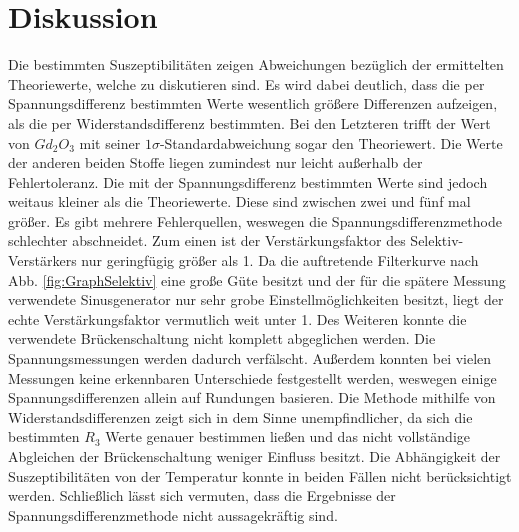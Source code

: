 
\section{Diskussion}
\label{sec:Diskussion}


Die bestimmten Suszeptibilitäten zeigen Abweichungen bezüglich der ermittelten Theoriewerte, welche zu diskutieren sind. Es wird dabei deutlich, dass die per Spannungsdifferenz 
bestimmten Werte wesentlich größere Differenzen aufzeigen, als die per Widerstandsdifferenz bestimmten. Bei den Letzteren trifft der Wert von $Gd_2O_3$ mit seiner $1 \sigma$-Standardabweichung sogar den Theoriewert. Die Werte der anderen beiden Stoffe liegen zumindest nur leicht außerhalb der Fehlertoleranz. Die mit der Spannungsdifferenz bestimmten Werte sind jedoch weitaus kleiner als die Theoriewerte. Diese sind zwischen zwei und fünf mal größer.
 Es gibt mehrere Fehlerquellen, weswegen die Spannungsdifferenzmethode schlechter abschneidet. Zum einen ist der Verstärkungsfaktor
des Selektiv-Verstärkers nur geringfügig größer als 1. Da die auftretende Filterkurve nach
Abb. \ref{fig:GraphSelektiv} eine große Güte besitzt und der für die spätere
Messung verwendete Sinusgenerator nur sehr grobe Einstellmöglichkeiten besitzt,
liegt der echte Verstärkungsfaktor vermutlich weit unter 1. Des Weiteren konnte
die verwendete Brückenschaltung nicht komplett abgeglichen werden. Die Spannungsmessungen werden dadurch verfälscht. Außerdem
konnten bei vielen Messungen keine erkennbaren Unterschiede festgestellt werden, weswegen einige Spannungsdifferenzen allein auf Rundungen basieren.
Die Methode mithilfe von Widerstandsdifferenzen zeigt sich in dem Sinne
unempfindlicher, da sich die bestimmten $R_3$ Werte genauer bestimmen ließen und das nicht vollständige Abgleichen der Brückenschaltung weniger Einfluss besitzt. Die Abhängigkeit der Suszeptibilitäten von der Temperatur konnte in beiden Fällen nicht berücksichtigt werden.
Schließlich lässt sich vermuten, dass die Ergebnisse der Spannungsdifferenzmethode nicht aussagekräftig sind. 